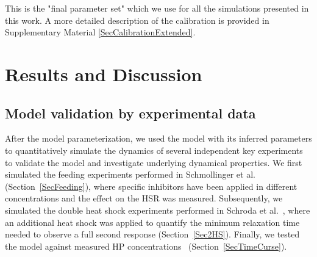 \documentclass[oneside, 10pt, a4paper, twocolumn]{article}
\begin{document}
This is the "final parameter set" which we use for all the simulations
presented in this work. %
A more detailed description of the calibration 
is provided in Supplementary Material \ref{SecCalibrationExtended}. 









\section{Results and Discussion}

\subsection{Model validation by experimental data}
\label{SectionExperiments}

After the model parameterization, we used the model with its inferred parameters to quantitatively simulate the dynamics of several independent key experiments to validate the model and investigate underlying dynamical properties. 
We first  simulated the feeding experiments performed in Schmollinger et al. \cite{Schmollinger2013} (Section~\ref{SecFeeding}),
where specific inhibitors have been applied in different concentrations and the
effect on the HSR was measured. Subsequently, we simulated the double heat shock experiments performed
in Schroda et al.~\cite{Schroda2000}, where an additional heat shock was applied 
to quantify the minimum relaxation time needed to observe a full second response (Section~\ref{Sec2HS}). Finally, we tested the model against measured HP concentrations~\cite{Muehlhaus2011} (Section~\ref{SecTimeCurse}).
\end{document}
